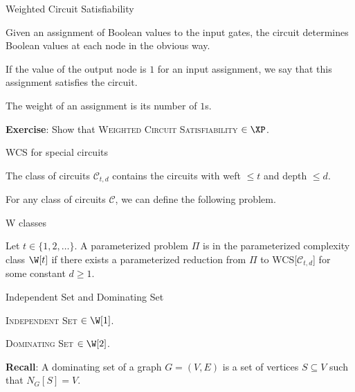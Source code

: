 \begin{frame}{Weighted Circuit Satisfiability}
	
	\noindent
	Given an assignment of Boolean values to the input gates, the circuit determines Boolean values at each node in the obvious way.
	
	\noindent
	If the value of the output node is $1$ for an input assignment, we say that this assignment \alert{satisfies} the circuit.
	
	\noindent
	The \alert{weight} of an assignment is its number of $1$s.
	
	
	\noindent
	\textbf{Exercise}: Show that \textsc{Weighted Circuit Satisfiability} $\in \XP$.
	 
\end{frame}

\begin{frame}{WCS for special circuits}
	\begin{definition}
	The class of circuits $\mathcal{C}_{t,d}$ contains the circuits with weft $\le t$ and depth $\le d$.
	\end{definition}
	
	\noindent
	For any class of circuits $\mathcal{C}$, we can define the following problem.
\end{frame}

\begin{frame}{W classes}
	
	\begin{definition}[W-hierarchy]
		Let $t\in \{1,2,\dots \}$.
		A parameterized problem $\Pi$ is in the parameterized complexity class $\W[t]$ if there exists a parameterized reduction from $\Pi$ to WCS[$\mathcal{C}_{t,d}$] for some constant $d\ge 1$.
	\end{definition}
	
\end{frame}

\begin{frame}{Independent Set and Dominating Set}
	
	\begin{theorem}
		\textsc{Independent Set} $\in \W[1]$.
	\end{theorem}
	\begin{theorem}
		\textsc{Dominating Set} $\in \W[2]$.
	\end{theorem}
	
	\noindent
	\textbf{Recall}: A \alert{dominating set} of a graph $G=(V,E)$ is a set of vertices $S\subseteq V$ such that $N_G[S]=V$.
\end{frame}

